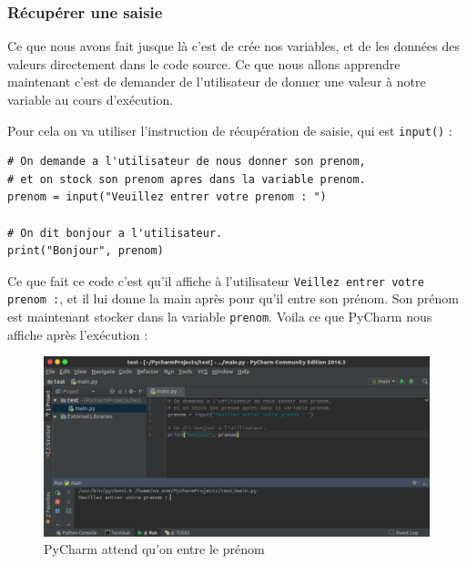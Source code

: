 \documentclass[12pt]{article}
\newcommand{\code}[1]{\colorbox{light-gray}{\texttt{#1}}}
\begin{document}
        \subsubsection{Récupérer une saisie}
            Ce que nous avons fait jusque là c'est de crée nos variables, et de les données des valeurs directement dans
            le code source. Ce que nous allons apprendre maintenant c'est de demander de l'utilisateur 
            de donner une valeur à notre variable au cours d'exécution.

            Pour cela on va utiliser l'instruction de récupération de saisie, qui est \code{input()} : 
            \begin{lstlisting}[style=code]
# On demande a l'utilisateur de nous donner son prenom,
# et on stock son prenom apres dans la variable prenom.
prenom = input("Veuillez entrer votre prenom : ")

# On dit bonjour a l'utilisateur.
print("Bonjour", prenom)
            \end{lstlisting}

            Ce que fait ce code c'est qu'il affiche à l'utilisateur \code{Veillez entrer votre prenom :}, et il lui 
            donne la main après pour qu'il entre son prénom. Son prénom est maintenant stocker dans la variable 
            \code{prenom}. Voila ce que PyCharm nous affiche après l'exécution :
            \begin{figure}[H]
                \centering
                \includegraphics[width=\linewidth]{img/16_input.png}
                \caption{PyCharm attend qu'on entre le prénom}
            \end{figure}
\end{document}
